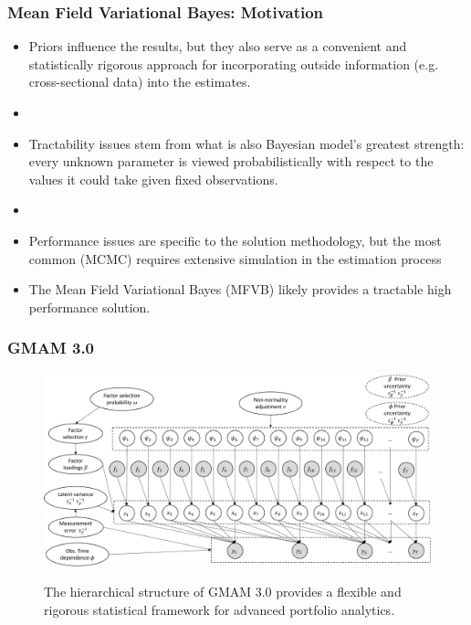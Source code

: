 \documentclass[10pt, compress]{beamer}
\begin{document}
\begin{frame}[fragile]
\frametitle{Mean Field Variational Bayes: Motivation} \label{fr:motivation}
\begin{itemize}
    \item Priors influence the results, but they also serve as a convenient and statistically rigorous approach for incorporating outside information (e.g. cross-sectional data) into the estimates.
    \item []
    \item Tractability issues stem from what is also Bayesian model's greatest strength: every unknown parameter is viewed probabilistically with respect to the values it could take given fixed observations.
    \item []
    \item Performance issues are specific to the solution methodology, but the most common (MCMC) requires extensive simulation in the estimation process
    
    \item []
    \vspace{12pt}
    \begin{kicker}
        The Mean Field Variational Bayes (MFVB) likely provides a tractable high performance solution.
    \end{kicker}
\end{itemize}
\end{frame}


\begin{frame}[fragile]
\frametitle{GMAM 3.0}
\begin{figure}
	\centering
	\includegraphics[width=1.04\linewidth]{docs/theory/DAG.pdf}\\
    \bigskip
    \begin{kicker}
        The hierarchical structure of GMAM 3.0 provides a flexible and rigorous statistical framework for advanced portfolio analytics.
    \end{kicker}
\end{figure}

\end{frame}
\end{document}
